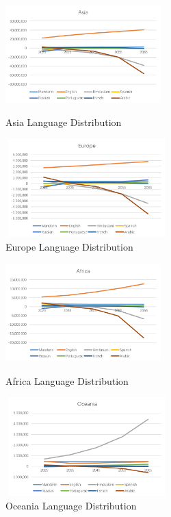 \documentclass{mcmthesis}
\begin{document}
    \begin{figure}[h]
      \begin{minipage}[t]{0.5\linewidth}
      \centering
      \includegraphics[height=3.8cm,width=6cm]{A01.png}%
      \caption{Asia Language Distribution}
      \label{p8}
      \end{minipage}
      \begin{minipage}[t]{0.5\linewidth}
      \centering
      \includegraphics[height=3.8cm,width=6.3cm]{A02.png}%
      \caption{Europe Language Distribution}
      \label{p9}
      \end{minipage}
    \end{figure}

    \begin{figure}[h]
      \begin{minipage}[t]{0.5\linewidth}
      \centering
      \includegraphics[height=3.8cm,width=6cm]{A03.png}%
      \caption{Africa Language Distribution}
      \label{p10}
      \end{minipage}
      \begin{minipage}[t]{0.5\linewidth}
      \centering
      \includegraphics[height=3.8cm,width=6.3cm]{A04.png}%
      \caption{Oceania Language Distribution}
      \label{p11}
      \end{minipage}
    \end{figure}
\end{document}
